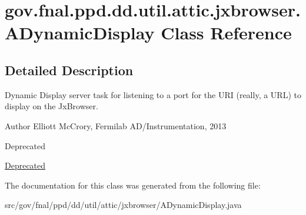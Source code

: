 \hypertarget{classgov_1_1fnal_1_1ppd_1_1dd_1_1util_1_1attic_1_1jxbrowser_1_1ADynamicDisplay}{\section{gov.\-fnal.\-ppd.\-dd.\-util.\-attic.\-jxbrowser.\-A\-Dynamic\-Display Class Reference}
\label{classgov_1_1fnal_1_1ppd_1_1dd_1_1util_1_1attic_1_1jxbrowser_1_1ADynamicDisplay}
}


\subsection{Detailed Description}
Dynamic Display server task for listening to a port for the U\-R\-I (really, a U\-R\-L) to display on the Jx\-Browser.

\begin{DoxyAuthor}{Author}
Elliott Mc\-Crory, Fermilab A\-D/\-Instrumentation, 2013 
\end{DoxyAuthor}
\begin{DoxyRefDesc}{Deprecated}
\item[\hyperlink{deprecated__deprecated000012}{Deprecated}]\end{DoxyRefDesc}


The documentation for this class was generated from the following file\-:\begin{DoxyCompactItemize}
\item 
src/gov/fnal/ppd/dd/util/attic/jxbrowser/A\-Dynamic\-Display.\-java\end{DoxyCompactItemize}
